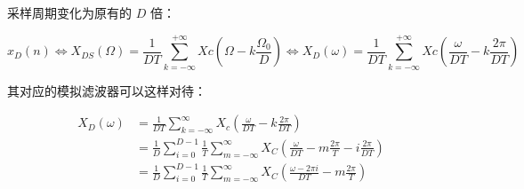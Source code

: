 \documentclass[cn,11pt,chinese,black,simple]{../elegantbook}
\begin{document}
采样周期变化为原有的 \(D\) 倍：

\[x_{D}(n) \Leftrightarrow X_{D S}(\Omega)=\frac{1}{D T} \sum_{k=-\infty}^{+\infty} X c\left(\Omega-k \frac{\Omega_{0}}{D}\right) \Leftrightarrow X_{D}(\omega)=\frac{1}{D T} \sum_{k=-\infty}^{+\infty} X c\left(\frac{\omega}{D T}-k \frac{2 \pi}{D T}\right)\] 

其对应的模拟滤波器可以这样对待：

\[\begin{aligned}
    X_D(\omega) &= \frac{1}{DT} \sum_{k = -\infty}^\infty X_c(\frac{\omega}{DT} - k \frac{2\pi}{DT}) \\ 
    &= \frac{1}{D} \sum_{i = 0}^{D-1} \frac{1}{T} \sum_{m=-\infty}^\infty X_C (\frac{\omega}{DT} - m \frac{2\pi}{T} - i \frac{2 \pi}{DT}) \\ 
    &= \frac{1}{D} \sum_{i = 0}^{D-1} \frac{1}{T} \sum_{m=-\infty}^\infty X_C (\frac{\omega - 2 \pi i}{DT} - m \frac{2\pi}{T}) \\ 
\end{aligned}\]



\let\chapname\undefined
\ifx\mainclass\undefined
\end{document}
